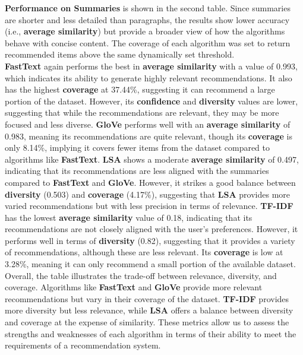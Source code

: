 \documentclass{llncs}
\begin{document}
\noindent
\textbf{Performance on Summaries} is shown in the second table. Since summaries are shorter and less detailed than paragraphs, the results show lower accuracy (i.e., \textbf{average similarity}) but provide a broader view of how the algorithms behave with concise content. The coverage of each algorithm was set to return recommended items above the same dynamically set threshold.\\
\noindent
\textbf{FastText} again performs the best in \textbf{average similarity} with a value of 0.993, which indicates its ability to generate highly relevant recommendations. It also has the highest \textbf{coverage} at 37.44\%, suggesting it can recommend a large portion of the dataset. However, its \textbf{confidence} and \textbf{diversity} values are lower, suggesting that while the recommendations are relevant, they may be more focused and less diverse. 
\noindent
\textbf{GloVe} performs well with an \textbf{average similarity} of 0.983, meaning its recommendations are quite relevant, though its \textbf{coverage} is only 8.14\%, implying it covers fewer items from the dataset compared to algorithms like \textbf{FastText}.
\noindent
\textbf{LSA} shows a moderate \textbf{average similarity} of 0.497, indicating that its recommendations are less aligned with the summaries compared to \textbf{FastText} and \textbf{GloVe}. However, it strikes a good balance between \textbf{diversity} (0.503) and \textbf{coverage} (4.17\%), suggesting that \textbf{LSA} provides more varied recommendations but with less precision in terms of relevance.
\noindent
\textbf{TF-IDF} has the lowest \textbf{average similarity} value of 0.18, indicating that its recommendations are not closely aligned with the user's preferences. However, it performs well in terms of \textbf{diversity} (0.82), suggesting that it provides a variety of recommendations, although these are less relevant. Its \textbf{coverage} is low at 3.28\%, meaning it can only recommend a small portion of the available dataset.
\noindent
Overall, the table illustrates the trade-off between relevance, diversity, and coverage. Algorithms like \textbf{FastText} and \textbf{GloVe} provide more relevant recommendations but vary in their coverage of the dataset. \textbf{TF-IDF} provides more diversity but less relevance, while \textbf{LSA} offers a balance between diversity and coverage at the expense of similarity. These metrics allow us to assess the strengths and weaknesses of each algorithm in terms of their ability to meet the requirements of a recommendation system.\\
\end{document}
